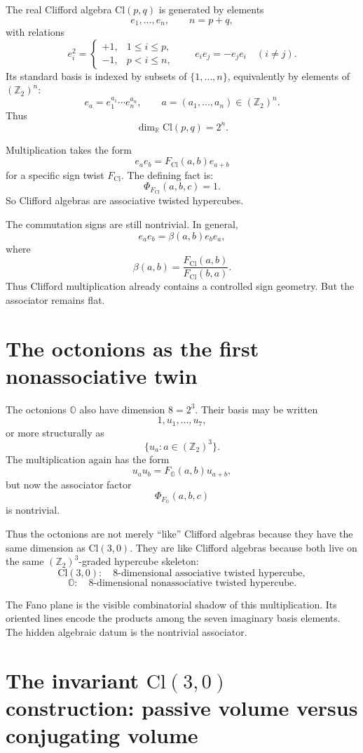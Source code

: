 \documentclass[11pt]{article}
\newcommand{\Ztwo}{\mathbb Z_2}
\newcommand{\R}{\mathbb R}
\newcommand{\Cl}{\mathrm{Cl}}
\newcommand{\OO}{\mathbb O}
\newcommand{\assoc}{\Phi}
\begin{document}
The real Clifford algebra $\Cl(p,q)$ is generated by elements
\[
e_1,\dots,e_n,\qquad n=p+q,
\]
with relations
\[
e_i^2 =
\begin{cases}
+1, & 1\leq i\leq p,\\
-1, & p<i\leq n,
\end{cases}
\qquad
e_i e_j = - e_j e_i
\quad (i\neq j).
\]
Its standard basis is indexed by subsets of $\{1,\dots,n\}$, equivalently by
elements of $(\Ztwo)^n$:
\[
e_a = e_1^{a_1}\cdots e_n^{a_n},
\qquad
a=(a_1,\dots,a_n)\in(\Ztwo)^n.
\]
Thus
\[
\dim_\R \Cl(p,q)=2^n.
\]

Multiplication takes the form
\[
e_a e_b = F_{\Cl}(a,b)e_{a+b}
\]
for a specific sign twist $F_{\Cl}$. The defining fact is:
\[
\assoc_{F_{\Cl}}(a,b,c)=1.
\]
So Clifford algebras are associative twisted hypercubes.

The commutation signs are still nontrivial. In general,
\[
e_a e_b
=
\beta(a,b) e_b e_a,
\]
where
\[
\beta(a,b)
=
\frac{F_{\Cl}(a,b)}{F_{\Cl}(b,a)}.
\]
Thus Clifford multiplication already contains a controlled sign geometry.
But the associator remains flat.

\section{The octonions as the first nonassociative twin}

The octonions $\OO$ also have dimension $8=2^3$. Their basis may be written
\[
1,u_1,\dots,u_7,
\]
or more structurally as
\[
\{u_a:a\in(\Ztwo)^3\}.
\]
The multiplication again has the form
\[
u_a u_b = F_{\OO}(a,b)u_{a+b},
\]
but now the associator factor
\[
\assoc_{F_{\OO}}(a,b,c)
\]
is nontrivial.

Thus the octonions are not merely ``like'' Clifford algebras because they
have the same dimension as $\Cl(3,0)$. They are like Clifford algebras
because both live on the same $(\Ztwo)^3$-graded hypercube skeleton:
\[
\Cl(3,0): \quad 8\text{-dimensional associative twisted hypercube},
\]
\[
\OO: \quad 8\text{-dimensional nonassociative twisted hypercube}.
\]

The Fano plane is the visible combinatorial shadow of this multiplication.
Its oriented lines encode the products among the seven imaginary basis
elements. The hidden algebraic datum is the nontrivial associator.


\section{The invariant $\Cl(3,0)$ construction: passive volume versus conjugating volume}
\end{document}
